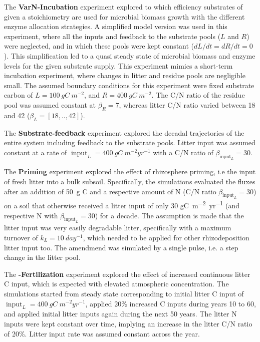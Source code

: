 The \textbf{VarN-Incubation} experiment explored to which efficiency substrates of
given a stoichiometry are used for microbial biomass growth with the different
enzyme allocation strategies. A simplified model version was used in this
experiment, where all the inputs and feedback to the substrate pools ($L$ and $R$)
were neglected, and in which these pools were
kept constant ($dL/dt = dR/dt = 0$). This simplification led to a quasi
steady state of microbial biomass and enzyme levels for the given substrate supply. This
experiment mimics a short-term incubation experiment, where changes in litter and
residue pools are negligible small. The assumed boundary conditions for this
experiment were fixed substrate carbon of $L=100~\unit{gC~m^{-2}}$, and $R=400~
\unit{gC~m^{-2}}$. The C/N ratio of the residue pool was assumed constant at
$\beta_R=7$, whereas litter C/N ratio varied between 18 and 42 ($\beta_L =
[18,..,42]$).

The \textbf{Substrate-feedback} experiment explored the decadal trajectories
of the entire system including feedback to the substrate pools. Litter input was
assumed constant at a rate of $\operatorname{input}_L =
400~\unit{gC~m^{-2}yr^{-1}}$ with a C/N ratio of $\beta_{\operatorname{input}_L} = 30$.

The \textbf{Priming} experiment explored the effect of rhizosphere priming, i.e
the input of fresh litter into a bulk subsoil. Specifically, the simulations
evaluated the fluxes after an addition of 50~\unit{g} C and a respective amount
of N (C/N ratio $\beta_{\operatorname{input}_L} = 30$) on a soil that otherwise
received a litter input of only 30 \unit{gC~m^{-2}yr^{-1}} (and respective N
with $\beta_{\operatorname{input}_L} = 30$) for a decade. The assumption is made that
the litter input was very easily degradable litter, specifically with a maximum
turnover of $k_L = 10~\unit{day^{-1}}$, which needed to be applied for other
rhizodeposition litter input too. The amendmend was simulated by a single pulse,
i.e. a step change in the litter pool.

The \textbf{-Fertilization} experiment explored the effect of
increased continuous litter C input, which is expected with elevated atmospheric
 concentration.
The simulations started from steady state corresponding to initial litter C
input of $\operatorname{input}_L = 400~\unit{gC~m^{-2}yr^{-1}}$, applied 20\%
increased C inputs during years 10 to 60, and applied initial litter inputs
again during the next 50 years. The litter N inputs were kept constant over
time, implying an increase in the litter C/N ratio of 20\%. Litter input rate
was assumed constant across the year.

